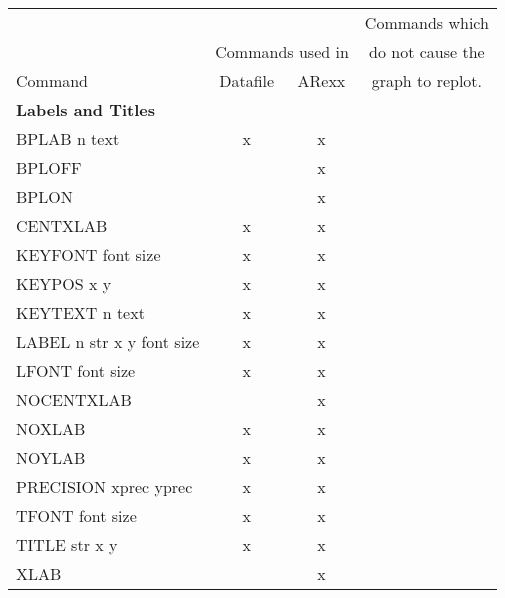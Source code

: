 \begin{table}[h] %
\begin{center}
\scriptsize
\begin{tabular}{lccc} \hline
                                 &           &        & Commands which     \\
                                 & \multicolumn{2}{c}{Commands used in} %
                                                      & do not cause the   \\ \cline{2-3}
Command                          & Datafile  & ARexx  & graph to replot.   \\ \hline
{\bf Labels and Titles}          &           &        &                    \\
BPLAB  n   text                  &     x     &     x  &                    \\
BPLOFF                           &           &     x  &                    \\
BPLON                            &           &     x  &                    \\
CENTXLAB                         &     x     &     x  &                    \\
KEYFONT  font   size             &     x     &     x  &                    \\
KEYPOS  x   y                    &     x     &     x  &                    \\
KEYTEXT  n   text                &     x     &     x  &                    \\
LABEL n str x y font size        &     x     &     x  &                    \\
LFONT  font   size               &     x     &     x  &                    \\
NOCENTXLAB                       &           &     x  &                    \\
NOXLAB                           &     x     &     x  &                    \\
NOYLAB                           &     x     &     x  &                    \\
PRECISION  xprec   yprec         &     x     &     x  &                    \\
TFONT  font   size               &     x     &     x  &                    \\
TITLE  str   x   y               &     x     &     x  &                    \\
XLAB                             &           &     x  &                    \\

\end{tabular}
\end{center}
\end{table}
